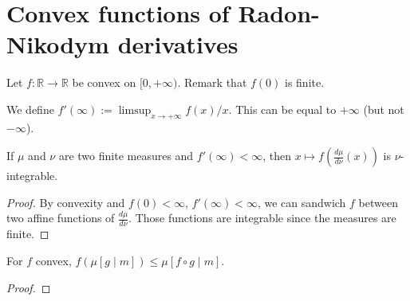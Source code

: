 \chapter{Convex functions of Radon-Nikodym derivatives}

Let $f : \mathbb{R} \to \mathbb{R}$ be convex on $[0, +\infty)$. Remark that $f(0)$ is finite.

\begin{definition}
  \label{def:derivAtTop}
  \leanok
  We define $f'(\infty) := \limsup_{x \to + \infty} f(x)/x$. This can be equal to $+\infty$ (but not $-\infty$).
\end{definition}

\begin{lemma}
  \label{lem:integrable_f_rnDeriv_of_derivAtTop_ne_top}
  \leanok
  If $\mu$ and $\nu$ are two finite measures and $f'(\infty) < \infty$, then $x \mapsto f\left(\frac{d\mu}{d\nu}(x)\right)$ is $\nu$-integrable. 
\end{lemma}

\begin{proof} \leanok
By convexity and $f(0) < \infty$, $f'(\infty)<\infty$, we can sandwich $f$ between two affine functions of $\frac{d\mu}{d\nu}$.
Those functions are integrable since the measures are finite.
\end{proof}

\begin{theorem}
  \label{thm:condexp_jensen}
  \notready
  For $f$ convex, $f\left(\mu [g \mid m]\right) \le \mu [f \circ g \mid m]$.
\end{theorem}

\begin{proof} %
\end{proof}